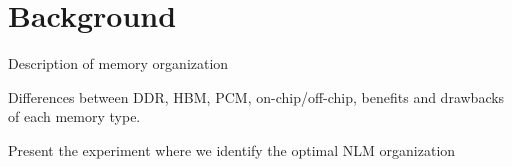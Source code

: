 
\section{Background}
\label{sec:Background}
Description of memory organization

Differences between DDR, HBM, PCM, on-chip/off-chip, benefits and drawbacks of each memory type.

Present the experiment where we identify the optimal NLM organization
